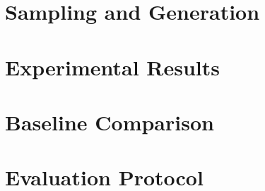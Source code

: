 \documentclass[11pt,a4paper]{article}
\begin{document}



\section{Sampling and Generation}
\label{sec:sampling}








\section{Experimental Results}
\label{sec:results}




















\section{Baseline Comparison}
\label{sec:baselines}




\section{Evaluation Protocol}
\label{sec:evaluation}
\end{document}
